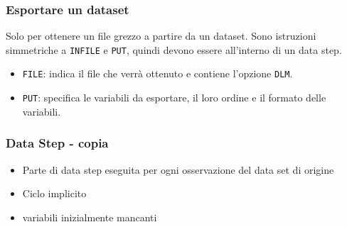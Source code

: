 \documentclass[12pt]{beamer}
\begin{document}
\begin{frame}[containsverbatim]\frametitle{Esportare un dataset}
Solo per ottenere un file grezzo a partire da un dataset.
Sono istruzioni simmetriche a \verb|INFILE| e \verb+PUT+, quindi devono essere
all'interno di un data step.

\begin{itemize}
\item
\verb+FILE+: indica il file che verrà ottenuto e contiene l'opzione \verb+DLM+.
\item
\verb+PUT+: specifica le variabili da esportare, il loro ordine e il formato
    delle variabili.
\end{itemize}
\end{frame}



\begin{frame}[fragile]\frametitle{Data Step - copia }
  \begin{itemize}
  \item
    Parte di data step eseguita per ogni osservazione del data set di origine
  \item
    Ciclo implicito
  \item variabili inizialmente mancanti
  \end{itemize}
\end{frame}





\end{document}
